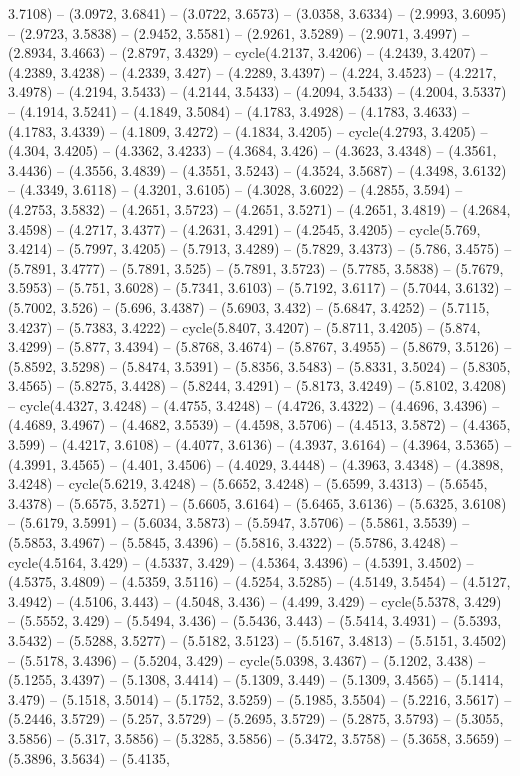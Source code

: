 3.7108) -- (3.0972, 3.6841) -- (3.0722, 3.6573) -- (3.0358, 3.6334) -- (2.9993, 3.6095) -- (2.9723, 3.5838) -- (2.9452, 3.5581) -- (2.9261, 3.5289) -- (2.9071, 3.4997) -- (2.8934, 3.4663) -- (2.8797, 3.4329) -- cycle(4.2137, 3.4206) -- (4.2439, 3.4207) -- (4.2389, 3.4238) -- (4.2339, 3.427) -- (4.2289, 3.4397) -- (4.224, 3.4523) -- (4.2217, 3.4978) -- (4.2194, 3.5433) -- (4.2144, 3.5433) -- (4.2094, 3.5433) -- (4.2004, 3.5337) -- (4.1914, 3.5241) -- (4.1849, 3.5084) -- (4.1783, 3.4928) -- (4.1783, 3.4633) -- (4.1783, 3.4339) -- (4.1809, 3.4272) -- (4.1834, 3.4205) -- cycle(4.2793, 3.4205) -- (4.304, 3.4205) -- (4.3362, 3.4233) -- (4.3684, 3.426) -- (4.3623, 3.4348) -- (4.3561, 3.4436) -- (4.3556, 3.4839) -- (4.3551, 3.5243) -- (4.3524, 3.5687) -- (4.3498, 3.6132) -- (4.3349, 3.6118) -- (4.3201, 3.6105) -- (4.3028, 3.6022) -- (4.2855, 3.594) -- (4.2753, 3.5832) -- (4.2651, 3.5723) -- (4.2651, 3.5271) -- (4.2651, 3.4819) -- (4.2684, 3.4598) -- (4.2717, 3.4377) -- (4.2631, 3.4291) -- (4.2545, 3.4205) -- cycle(5.769, 3.4214) -- (5.7997, 3.4205) -- (5.7913, 3.4289) -- (5.7829, 3.4373) -- (5.786, 3.4575) -- (5.7891, 3.4777) -- (5.7891, 3.525) -- (5.7891, 3.5723) -- (5.7785, 3.5838) -- (5.7679, 3.5953) -- (5.751, 3.6028) -- (5.7341, 3.6103) -- (5.7192, 3.6117) -- (5.7044, 3.6132) -- (5.7002, 3.526) -- (5.696, 3.4387) -- (5.6903, 3.432) -- (5.6847, 3.4252) -- (5.7115, 3.4237) -- (5.7383, 3.4222) -- cycle(5.8407, 3.4207) -- (5.8711, 3.4205) -- (5.874, 3.4299) -- (5.877, 3.4394) -- (5.8768, 3.4674) -- (5.8767, 3.4955) -- (5.8679, 3.5126) -- (5.8592, 3.5298) -- (5.8474, 3.5391) -- (5.8356, 3.5483) -- (5.8331, 3.5024) -- (5.8305, 3.4565) -- (5.8275, 3.4428) -- (5.8244, 3.4291) -- (5.8173, 3.4249) -- (5.8102, 3.4208) -- cycle(4.4327, 3.4248) -- (4.4755, 3.4248) -- (4.4726, 3.4322) -- (4.4696, 3.4396) -- (4.4689, 3.4967) -- (4.4682, 3.5539) -- (4.4598, 3.5706) -- (4.4513, 3.5872) -- (4.4365, 3.599) -- (4.4217, 3.6108) -- (4.4077, 3.6136) -- (4.3937, 3.6164) -- (4.3964, 3.5365) -- (4.3991, 3.4565) -- (4.401, 3.4506) -- (4.4029, 3.4448) -- (4.3963, 3.4348) -- (4.3898, 3.4248) -- cycle(5.6219, 3.4248) -- (5.6652, 3.4248) -- (5.6599, 3.4313) -- (5.6545, 3.4378) -- (5.6575, 3.5271) -- (5.6605, 3.6164) -- (5.6465, 3.6136) -- (5.6325, 3.6108) -- (5.6179, 3.5991) -- (5.6034, 3.5873) -- (5.5947, 3.5706) -- (5.5861, 3.5539) -- (5.5853, 3.4967) -- (5.5845, 3.4396) -- (5.5816, 3.4322) -- (5.5786, 3.4248) -- cycle(4.5164, 3.429) -- (4.5337, 3.429) -- (4.5364, 3.4396) -- (4.5391, 3.4502) -- (4.5375, 3.4809) -- (4.5359, 3.5116) -- (4.5254, 3.5285) -- (4.5149, 3.5454) -- (4.5127, 3.4942) -- (4.5106, 3.443) -- (4.5048, 3.436) -- (4.499, 3.429) -- cycle(5.5378, 3.429) -- (5.5552, 3.429) -- (5.5494, 3.436) -- (5.5436, 3.443) -- (5.5414, 3.4931) -- (5.5393, 3.5432) -- (5.5288, 3.5277) -- (5.5182, 3.5123) -- (5.5167, 3.4813) -- (5.5151, 3.4502) -- (5.5178, 3.4396) -- (5.5204, 3.429) -- cycle(5.0398, 3.4367) -- (5.1202, 3.438) -- (5.1255, 3.4397) -- (5.1308, 3.4414) -- (5.1309, 3.449) -- (5.1309, 3.4565) -- (5.1414, 3.479) -- (5.1518, 3.5014) -- (5.1752, 3.5259) -- (5.1985, 3.5504) -- (5.2216, 3.5617) -- (5.2446, 3.5729) -- (5.257, 3.5729) -- (5.2695, 3.5729) -- (5.2875, 3.5793) -- (5.3055, 3.5856) -- (5.317, 3.5856) -- (5.3285, 3.5856) -- (5.3472, 3.5758) -- (5.3658, 3.5659) -- (5.3896, 3.5634) -- (5.4135, 